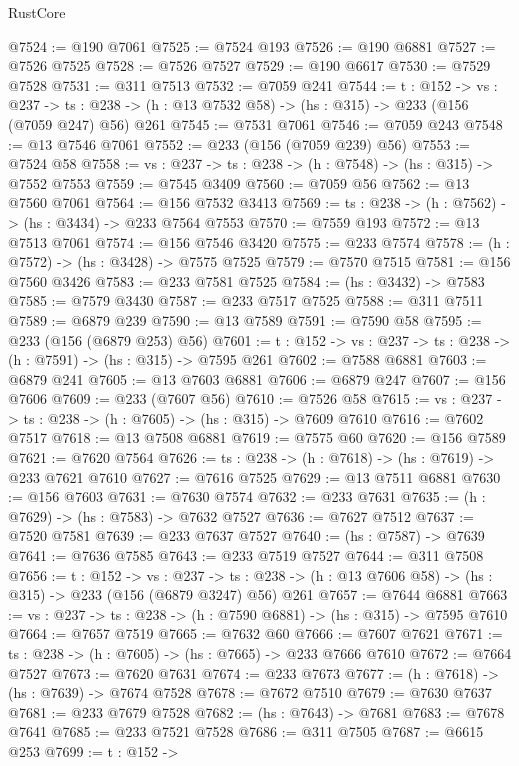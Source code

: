 \begin{lexlean}{RustCore}
\begin{coremodule}
@7524 := @190 @7061
@7525 := @7524 @193
@7526 := @190 @6881
@7527 := @7526 @7525
@7528 := @7526 @7527
@7529 := @190 @6617
@7530 := @7529 @7528
@7531 := @311 @7513
@7532 := @7059 @241
@7544 := {t : @152} ->
  {vs : @237} ->
  {ts : @238} -> (h : @13 @7532 @58) -> (hs : @315) -> @233 (@156 (@7059 @247) @56) @261
@7545 := @7531 @7061
@7546 := @7059 @243
@7548 := @13 @7546 @7061
@7552 := @233 (@156 (@7059 @239) @56)
@7553 := @7524 @58
@7558 := {vs : @237} -> {ts : @238} -> (h : @7548) -> (hs : @315) -> @7552 @7553
@7559 := @7545 @3409
@7560 := @7059 @56
@7562 := @13 @7560 @7061
@7564 := @156 @7532 @3413
@7569 := {ts : @238} -> (h : @7562) -> (hs : @3434) -> @233 @7564 @7553
@7570 := @7559 @193
@7572 := @13 @7513 @7061
@7574 := @156 @7546 @3420
@7575 := @233 @7574
@7578 := (h : @7572) -> (hs : @3428) -> @7575 @7525
@7579 := @7570 @7515
@7581 := @156 @7560 @3426
@7583 := @233 @7581 @7525
@7584 := (hs : @3432) -> @7583
@7585 := @7579 @3430
@7587 := @233 @7517 @7525
@7588 := @311 @7511
@7589 := @6879 @239
@7590 := @13 @7589
@7591 := @7590 @58
@7595 := @233 (@156 (@6879 @253) @56)
@7601 := {t : @152} -> {vs : @237} -> {ts : @238} -> (h : @7591) -> (hs : @315) -> @7595 @261
@7602 := @7588 @6881
@7603 := @6879 @241
@7605 := @13 @7603 @6881
@7606 := @6879 @247
@7607 := @156 @7606
@7609 := @233 (@7607 @56)
@7610 := @7526 @58
@7615 := {vs : @237} -> {ts : @238} -> (h : @7605) -> (hs : @315) -> @7609 @7610
@7616 := @7602 @7517
@7618 := @13 @7508 @6881
@7619 := @7575 @60
@7620 := @156 @7589
@7621 := @7620 @7564
@7626 := {ts : @238} -> (h : @7618) -> (hs : @7619) -> @233 @7621 @7610
@7627 := @7616 @7525
@7629 := @13 @7511 @6881
@7630 := @156 @7603
@7631 := @7630 @7574
@7632 := @233 @7631
@7635 := (h : @7629) -> (hs : @7583) -> @7632 @7527
@7636 := @7627 @7512
@7637 := @7520 @7581
@7639 := @233 @7637 @7527
@7640 := (hs : @7587) -> @7639
@7641 := @7636 @7585
@7643 := @233 @7519 @7527
@7644 := @311 @7508
@7656 := {t : @152} ->
  {vs : @237} ->
  {ts : @238} -> (h : @13 @7606 @58) -> (hs : @315) -> @233 (@156 (@6879 @3247) @56) @261
@7657 := @7644 @6881
@7663 := {vs : @237} -> {ts : @238} -> (h : @7590 @6881) -> (hs : @315) -> @7595 @7610
@7664 := @7657 @7519
@7665 := @7632 @60
@7666 := @7607 @7621
@7671 := {ts : @238} -> (h : @7605) -> (hs : @7665) -> @233 @7666 @7610
@7672 := @7664 @7527
@7673 := @7620 @7631
@7674 := @233 @7673
@7677 := (h : @7618) -> (hs : @7639) -> @7674 @7528
@7678 := @7672 @7510
@7679 := @7630 @7637
@7681 := @233 @7679 @7528
@7682 := (hs : @7643) -> @7681
@7683 := @7678 @7641
@7685 := @233 @7521 @7528
@7686 := @311 @7505
@7687 := @6615 @253
@7699 := {t : @152} ->

\end{coremodule}
\end{lexlean}
